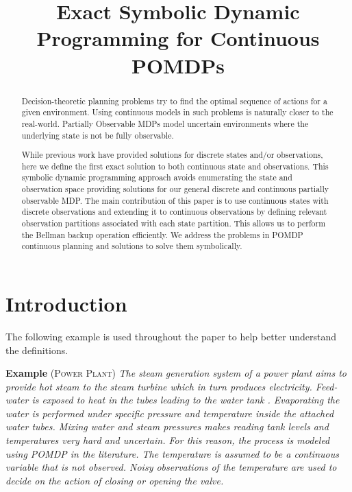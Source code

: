\documentclass{article} %
\title{Exact Symbolic Dynamic Programming for Continuous POMDPs}
\author{
}
\begin{document}
\maketitle

\begin{abstract}
Decision-theoretic planning problems try to find the optimal sequence of actions for a given environment. Using continuous models in such problems is naturally closer to the real-world. Partially Observable MDPs model uncertain environments where the underlying state is not be fully observable. 

While previous work have provided solutions for discrete states and/or observations, here we define the first exact solution to both continuous state and observations. This symbolic dynamic programming approach avoids enumerating the state and observation space providing solutions for our general discrete and continuous partially observable MDP. The main contribution of this paper is to use continuous states with discrete observations and extending it to continuous observations by defining relevant observation partitions associated with each state partition. This allows us to perform the Bellman backup operation efficiently. We address the problems in POMDP continuous planning and solutions to solve them symbolically. %
\end{abstract}

\section{Introduction}

The following example is used throughout the paper to help better understand the definitions. 

\textbf{Example} \textsc{(Power Plant)}
\emph{The steam generation system of a power plant aims to provide hot steam to the steam turbine which in turn produces electricity. Feed-water is exposed to heat in the tubes leading to the water tank . Evaporating the water is performed under specific pressure and temperature inside the attached water tubes. 
Mixing water and steam pressures makes reading tank levels and temperatures very hard and uncertain. For this reason, the process is modeled using POMDP in the literature. The temperature is assumed to be a continuous variable that is not observed. Noisy observations of the temperature are used to decide on the action of closing or opening the valve.}
\end{document}
